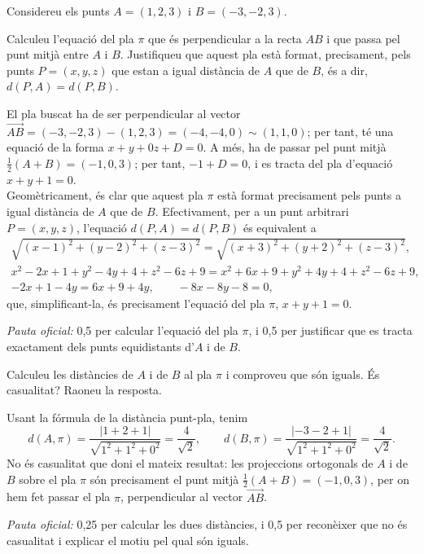 Considereu els punts $A=(1,2,3)$ i $B=(-3,-2,3)$.

\begin{apartats}

Calculeu l'equació del pla $\pi$ que és perpendicular a la recta $AB$ i que passa pel punt mitjà entre $A$ i $B$.
Justifiqueu que aquest pla està format, precisament, pels punts $P=(x,y,z)$ que estan a igual distància de $A$
que de $B$, és a dir, $d(P,A)=d(P,B)$.

\begin{solucio}
El pla buscat ha de ser perpendicular al vector $\overrightarrow{AB}=(-3,-2,3)-(1,2,3)=(-4,-4,0)\sim(1,1,0)$; per
tant, té una equació de la forma $x+y+0z+D=0$. A més, ha de passar pel punt mitjà $\frac12(A+B)=(-1,0,3)$; per
tant, $-1+D=0$, i es tracta del pla d'equació $x+y+1=0$.\\
Geomètricament, és clar que aquest pla $\pi$ està format precisament pels punts a igual distància de $A$ que de
$B$. Efectivament, per a un punt arbitrari $P=(x,y,z)$, l'equació $d(P,A)=d(P,B)$ és equivalent a
\begin{gather*}
\sqrt{(x-1)^2+(y-2)^2+(z-3)^2}=\sqrt{(x+3)^2+(y+2)^2+(z-3)^2},\\
x^2-2x+1+y^2-4y+4+z^2-6z+9=x^2+6x+9+y^2+4y+4+z^2-6z+9,\\
-2x+1-4y=6x+9+4y,\qquad-8x-8y-8=0,
\end{gather*}
que, simplificant-la, és precisament l'equació del pla $\pi$, $x+y+1=0$.

\textit{Pauta oficial:} 0,5 per calcular l'equació del pla $\pi$, i 0,5 per justificar que es tracta exactament
dels punts equidistants d'$A$ i de $B$.
\end{solucio}

Calculeu les distàncies de $A$ i de $B$ al pla $\pi$ i comproveu que són iguals. És casualitat? Raoneu la
resposta.

\begin{solucio}
Usant la fórmula de la distància punt-pla, tenim
\[
d(A,\pi)=\frac{|1+2+1|}{\sqrt{1^2+1^2+0^2}}=\frac{4}{\sqrt2},\qquad
d(B,\pi)=\frac{|-3-2+1|}{\sqrt{1^2+1^2+0^2}}=\frac{4}{\sqrt2}.
\]
No és casualitat que doni el mateix resultat: les projeccions ortogonals de $A$ i de $B$ sobre el pla $\pi$ són
precisament el punt mitjà $\frac12(A+B)=(-1,0,3)$, per on hem fet passar el pla $\pi$, perpendicular al vector
$\overrightarrow{AB}$.

\textit{Pauta oficial:} 0,25 per calcular les dues distàncies, i 0,5 per reconèixer que no és casualitat i
explicar el motiu pel qual són iguals.
\end{solucio}


\end{apartats}
